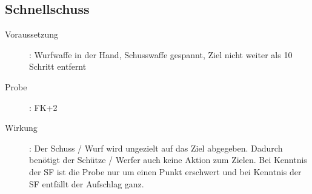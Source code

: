 \subsection{Schnellschuss}
\label{fernkampf.schnellschuss}
\begin{description}
    \item[Voraussetzung]:
        Wurfwaffe in der Hand, Schusswaffe gespannt, Ziel nicht weiter als 10 Schritt entfernt
    \item[Probe]:
        FK+2
    \item[Wirkung]:
        Der Schuss / Wurf wird ungezielt auf das Ziel abgegeben.
        Dadurch benötigt der Schütze / Werfer auch keine Aktion zum Zielen.
        Bei Kenntnis der SF  ist die Probe nur um einen Punkt erschwert und bei Kenntnis der SF  entfällt der Aufschlag ganz.
\end{description}
